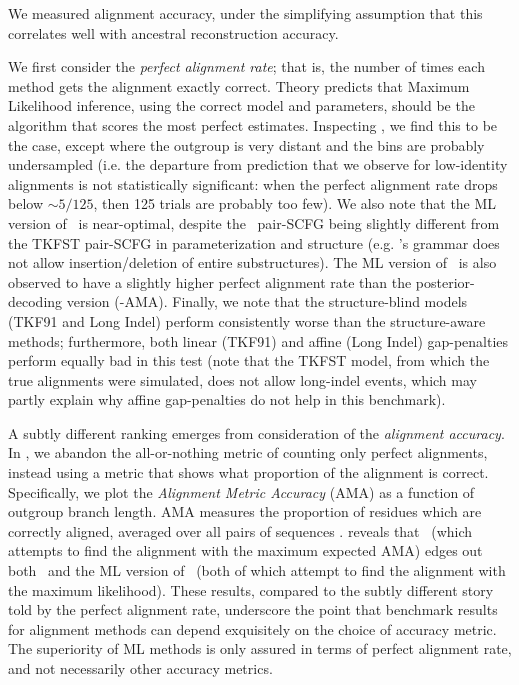 \documentclass[10pt]{article}
\begin{document}
We measured alignment accuracy, under the simplifying assumption that this correlates well with ancestral reconstruction accuracy.

We first consider the {\em perfect alignment rate}; that is, the number of times each method gets the alignment exactly correct.
Theory predicts that Maximum Likelihood inference, using the correct model and parameters, should be the algorithm that scores the most perfect estimates.
Inspecting , we find this to be the case, except where the outgroup is very distant and the bins are probably undersampled
(i.e. the departure from prediction that we observe for low-identity alignments is not statistically significant:
when the perfect alignment rate drops below $\sim 5/125$, then 125 trials are probably too few).
We also note that the ML version of \stemloc\ is near-optimal, despite the \stemloc\ pair-SCFG being
slightly different from the TKFST pair-SCFG in parameterization and structure
 (e.g. \stemloc's grammar does not allow insertion/deletion of entire substructures).
The ML version of \stemloc\ is also observed to have a slightly higher perfect alignment rate than the posterior-decoding version (\stemloc-AMA).
Finally, we note that the structure-blind models (TKF91 and Long Indel) perform consistently worse than the structure-aware methods;
furthermore, both linear (TKF91) and affine (Long Indel) gap-penalties perform equally bad in this test
(note that the TKFST model, from which the true alignments were simulated, does not allow long-indel events,
which may partly explain why affine gap-penalties do not help in this benchmark).

A subtly different ranking emerges from consideration of the {\em alignment accuracy}.
In , we abandon the all-or-nothing metric of counting only perfect alignments,
instead using a metric that shows what proportion of the alignment is correct.
Specifically, we plot the {\em Alignment Metric Accuracy} (AMA) as a function of outgroup branch length.
AMA measures the proportion of residues which are correctly aligned, averaged over all pairs of sequences \cite{SchwartzMyersPachter2006}.
 reveals that \stemlocama\ (which attempts to find the alignment with the maximum expected AMA)
edges out both \indiegram\ and the ML version of \stemloc\ (both of which attempt to find the alignment with the maximum likelihood).
These results, compared to the subtly different story told by the perfect alignment rate,
underscore the point that benchmark results for alignment methods can depend exquisitely on the choice of accuracy metric.
The superiority of ML methods is only assured in terms of perfect alignment rate, and not necessarily other accuracy metrics.
\end{document}
